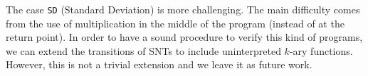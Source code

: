 






The case \texttt{SD} (Standard Deviation) is more challenging. The main difficulty comes from the use of multiplication in the middle of the program (instead of at the return point). In order to have a sound procedure to verify this kind of programs, we can extend the transitions of SNTs to include uninterpreted $k$-ary functions. However, this is not a trivial extension and we leave it as future work.


